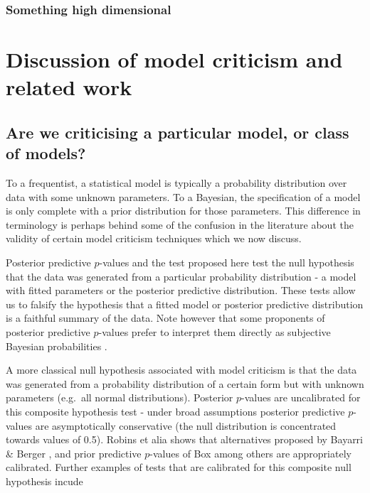 \documentclass{article} %
\def\eg{e.g.\ }
\begin{document}
\subsubsection{Something high dimensional}


\section{Discussion of model criticism and related work}


\subsection{Are we criticising a particular model, or class of models?}

To a frequentist, a statistical model is typically a probability distribution over data with some unknown parameters.
To a Bayesian, the specification of a model is only complete with a prior distribution for those parameters.
This difference in terminology is perhaps behind some of the confusion in the literature about the validity of certain model criticism techniques which we now discuss.

Posterior predictive $p$-values and the test proposed here test the null hypothesis that the data was generated from a particular probability distribution - a model with fitted parameters or the posterior predictive distribution.
These tests allow us to falsify the hypothesis that a fitted model or posterior predictive distribution is a faithful summary of the data.
Note however that some proponents of posterior predictive $p$-values prefer to interpret them directly as subjective Bayesian probabilities \citep{Gelman2013-am}.

A more classical null hypothesis associated with model criticism is that the data was generated from a probability distribution of a certain form but with unknown parameters (\eg all normal distributions).
Posterior $p$-values are uncalibrated for this composite hypothesis test \citep{Robins2000-oz} - under broad assumptions posterior predictive $p$-values are asymptotically conservative (the null distribution is concentrated towards values of 0.5).
Robins et alia \citep{Robins2000-oz} shows that alternatives proposed by Bayarri \& Berger \citep{Bayarri1999-ty}, and prior predictive $p$-values of Box \citep{Box1980-ud} among others are appropriately calibrated.
Further examples of tests that are calibrated for this composite null hypothesis incude \citep[e.g.][]{Dey1998-dn, Johnson2004-ej}
\end{document}
